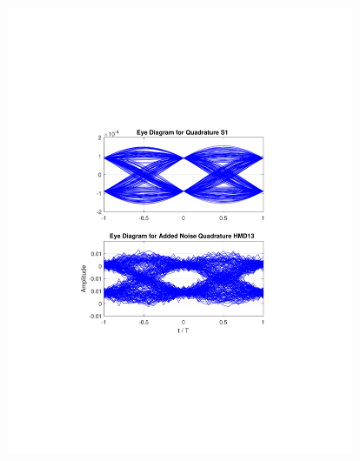 \begin{refsection}
\begin{figure}[H]
\begin{minipage}{\linewidth}
\begin{subfigure}{.45\textwidth}
		\includegraphics[clip, trim=5cm 7cm 5cm 7cm, width=\textwidth]{./sdf/m_qam_system/figures/eyes/q_n_nmf_45_60_rc.pdf}
	\end{subfigure}
	

\end{minipage}
\end{figure}
\end{refsection}
